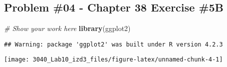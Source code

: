 \documentclass[
]{article}
\newenvironment{Shaded}{\begin{snugshade}}{\end{snugshade}}
\newcommand{\AttributeTok}[1]{\textcolor[rgb]{0.13,0.29,0.53}{#1}}
\newcommand{\CommentTok}[1]{\textcolor[rgb]{0.56,0.35,0.01}{\textit{#1}}}
\newcommand{\DecValTok}[1]{\textcolor[rgb]{0.00,0.00,0.81}{#1}}
\newcommand{\FunctionTok}[1]{\textcolor[rgb]{0.13,0.29,0.53}{\textbf{#1}}}
\newcommand{\NormalTok}[1]{#1}
\newcommand{\OtherTok}[1]{\textcolor[rgb]{0.56,0.35,0.01}{#1}}
\newcommand{\SpecialCharTok}[1]{\textcolor[rgb]{0.81,0.36,0.00}{\textbf{#1}}}
\newcommand{\StringTok}[1]{\textcolor[rgb]{0.31,0.60,0.02}{#1}}
\begin{document}
\newpage

\hypertarget{problem-04---chapter-38-exercise-5b}{%
\subsection{Problem \#04 - Chapter 38 Exercise
\#5B}\label{problem-04---chapter-38-exercise-5b}}

\begin{Shaded}
\begin{Highlighting}[]
\CommentTok{\# Show your work here}
\FunctionTok{library}\NormalTok{(ggplot2)}
\end{Highlighting}
\end{Shaded}

\begin{verbatim}
## Warning: package 'ggplot2' was built under R version 4.2.3
\end{verbatim}

\begin{Shaded}
\end{Shaded}

\texttt{[image: 3040\_Lab10\_izd3\_files/figure-latex/unnamed-chunk-4-1]}
\end{document}
